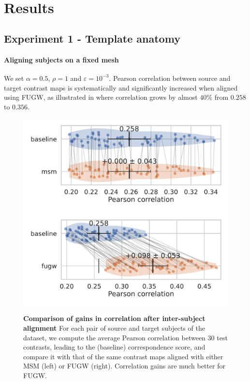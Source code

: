 \section{Results}

\subsection{Experiment 1 - Template anatomy}

\paragraph{Aligning subjects on a fixed mesh}

We set $\alpha = 0.5$, $\rho = 1$ and $\varepsilon = 10^{-3}$.
Pearson correlation between source and target contrast maps is systematically and
significantly increased when aligned using FUGW, as illustrated in
 where correlation grows by almost $40\%$
from $0.258$ to $0.356$.

\begin{figure}[ht!]
    \centering
    \includegraphics[width=0.49\columnwidth]{./Chapitre4/figures/fsaverage5_alignment_correlation_gain_msm.pdf}
    \includegraphics[width=0.49\columnwidth]{./Chapitre4/figures/fsaverage5_alignment_correlation_gain_fugw.pdf}
    \caption{
        \textbf{Comparison of gains in correlation after inter-subject alignment}
        For each pair of source and target subjects of the dataset,
        we compute the average Pearson correlation between 30 test contrasts,
        leading to the (baseline) correspondence score,
        and compare it with that of the same contrast maps
        aligned with either MSM (left) or FUGW (right). Correlation gains are much better for FUGW.
    }
    \label{fig:gain_comparisions_fsaverage5}
\end{figure}

